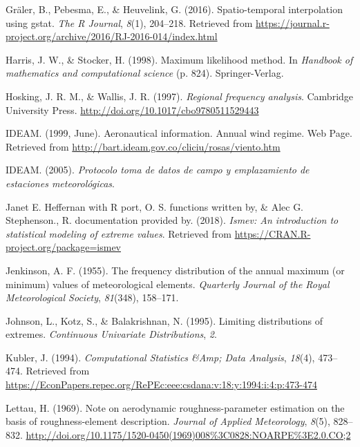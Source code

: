 \documentclass[12pt,twoside]{reedthesis}
\begin{document}
\leavevmode\hypertarget{ref-Graeler2016}{}%
Gräler, B., Pebesma, E., \& Heuvelink, G. (2016). Spatio-temporal interpolation using gstat. \emph{The R Journal}, \emph{8}(1), 204--218. Retrieved from \url{https://journal.r-project.org/archive/2016/RJ-2016-014/index.html}

\leavevmode\hypertarget{ref-Harris1994}{}%
Harris, J. W., \& Stocker, H. (1998). Maximum likelihood method. In \emph{Handbook of mathematics and computational science} (p. 824). Springer-Verlag.

\leavevmode\hypertarget{ref-Hosking1997}{}%
Hosking, J. R. M., \& Wallis, J. R. (1997). \emph{Regional frequency analysis}. Cambridge University Press. \url{http://doi.org/10.1017/cbo9780511529443}

\leavevmode\hypertarget{ref-ideam1999}{}%
IDEAM. (1999, June). Aeronautical information. Annual wind regime. Web Page. Retrieved from \url{http://bart.ideam.gov.co/cliciu/rosas/viento.htm}

\leavevmode\hypertarget{ref-ideam2005}{}%
IDEAM. (2005). \emph{Protocolo toma de datos de campo y emplazamiento de estaciones meteorológicas}.

\leavevmode\hypertarget{ref-JanetE.HeffernanwithRport2018}{}%
Janet E. Heffernan with R port, O. S. functions written by, \& Alec G. Stephenson., R. documentation provided by. (2018). \emph{Ismev: An introduction to statistical modeling of extreme values}. Retrieved from \url{https://CRAN.R-project.org/package=ismev}

\leavevmode\hypertarget{ref-Jenkinson1955}{}%
Jenkinson, A. F. (1955). The frequency distribution of the annual maximum (or minimum) values of meteorological elements. \emph{Quarterly Journal of the Royal Meteorological Society}, \emph{81}(348), 158--171.

\leavevmode\hypertarget{ref-Johnson1995}{}%
Johnson, L., Kotz, S., \& Balakrishnan, N. (1995). Limiting distributions of extremes. \emph{Continuous Univariate Distributions}, \emph{2}.

\leavevmode\hypertarget{ref-Kubler1994}{}%
Kubler, J. (1994). \emph{Computational Statistics \&Amp; Data Analysis}, \emph{18}(4), 473--474. Retrieved from \url{https://EconPapers.repec.org/RePEc:eee:csdana:v:18:y:1994:i:4:p:473-474}

\leavevmode\hypertarget{ref-Lettau1969}{}%
Lettau, H. (1969). Note on aerodynamic roughness-parameter estimation on the basis of roughness-element description. \emph{Journal of Applied Meteorology}, \emph{8}(5), 828--832. \url{http://doi.org/10.1175/1520-0450(1969)008\%3C0828:NOARPE\%3E2.0.CO;2}
\end{document}
